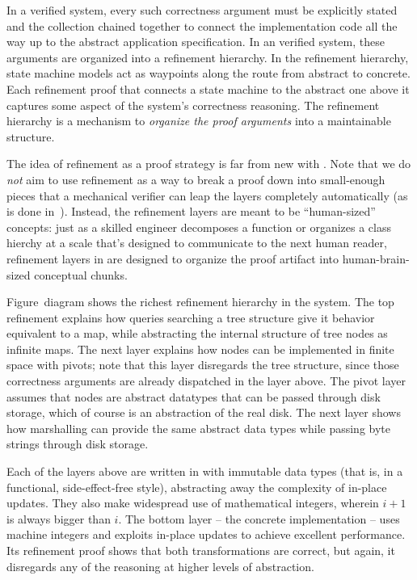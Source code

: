 In a verified system, every such correctness argument must be explicitly
stated and the collection chained together to connect the implementation
code all the way up to the abstract application specification.
In an {\ironstar} verified system, these arguments are organized into
a refinement hierarchy.
In the refinement hierarchy, state machine models act as waypoints
along the route from abstract to concrete. Each refinement proof that
connects a state machine to the abstract one above it captures some
aspect of the system's correctness reasoning. 
The refinement hierarchy is a mechanism to \textit{organize the
proof arguments} into a maintainable structure.


The idea of refinement as a proof strategy is far from new with {\ironstar}.
Note that we do \textit{not} aim to use refinement
as a way to break a proof down into small-enough pieces that a
mechanical verifier can leap the layers completely automatically
(as is done in~\cite{cspec,ironarmada}).
Instead, the refinement layers are meant to be ``human-sized'' concepts:
just as a skilled engineer decomposes a function or organizes a
class hierchy at a scale that's designed to communicate to the next
human reader,
refinement layers in {\ironstar} are designed to organize the proof
artifact into human-brain-sized conceptual chunks.

Figure~{diagram} shows the richest refinement hierarchy in the
{\veribetrfs} system.
The top refinement explains how queries searching a {\bepsilon}tree
structure give it behavior equivalent to a map,
while abstracting the internal structure of tree nodes as infinite
maps.
The next layer explains how nodes can be implemented in finite space
with pivots; note that this layer disregards the {\bepsilon}tree structure,
since those correctness arguments are already dispatched in the
layer above.
The pivot layer assumes that nodes are abstract datatypes that can
be passed through disk storage, which of course is an abstraction of
the real disk. The next layer shows how marshalling can provide the
same abstract data types while passing byte strings through disk storage.

Each of the layers above are written in with immutable data types
(that is, in a functional, side-effect-free style), abstracting away
the complexity of in-place updates. They also make widespread use of
mathematical integers, wherein $i+1$ is always bigger than $i$.
The bottom layer -- the concrete implementation -- uses machine integers
and exploits in-place updates to achieve excellent performance.
Its refinement proof shows that both transformations are correct,
but again, it disregards any of the reasoning at higher levels of
abstraction.

